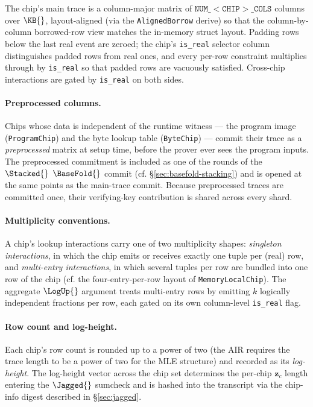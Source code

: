 The chip's main trace is a column-major matrix of $\mathtt{NUM\_<CHIP>\_COLS}$ columns over $\KB{}$, layout-aligned (via the \texttt{AlignedBorrow} derive) so that the column-by-column borrowed-row view matches the in-memory struct layout. Padding rows below the last real event are zeroed; the chip's \texttt{is\_real} selector column distinguishes padded rows from real ones, and every per-row constraint multiplies through by \texttt{is\_real} so that padded rows are vacuously satisfied. Cross-chip interactions are gated by \texttt{is\_real} on both sides.

\paragraph{Preprocessed columns.} Chips whose data is independent of the runtime witness — the program image (\texttt{ProgramChip}) and the byte lookup table (\texttt{ByteChip}) — commit their trace as a \emph{preprocessed} matrix at setup time, before the prover ever sees the program inputs. The preprocessed commitment is included as one of the rounds of the $\Stacked{}$ $\BaseFold{}$ commit (cf. \S\ref{sec:basefold-stacking}) and is opened at the same points as the main-trace commit. Because preprocessed traces are committed once, their verifying-key contribution is shared across every shard.

\paragraph{Multiplicity conventions.} A chip's lookup interactions carry one of two multiplicity shapes: \emph{singleton interactions}, in which the chip emits or receives exactly one tuple per (real) row, and \emph{multi-entry interactions}, in which several tuples per row are bundled into one row of the chip (cf. the four-entry-per-row layout of \texttt{MemoryLocalChip}). The aggregate $\LogUp{}$ argument treats multi-entry rows by emitting $k$ logically independent fractions per row, each gated on its own column-level \texttt{is\_real} flag.

\paragraph{Row count and log-height.} Each chip's row count is rounded up to a power of two (the AIR requires the trace length to be a power of two for the MLE structure) and recorded as its \emph{log-height}. The log-height vector across the chip set determines the per-chip $\bm z_c$ length entering the $\Jagged{}$ sumcheck and is hashed into the transcript via the chip-info digest described in \S\ref{sec:jagged}.

